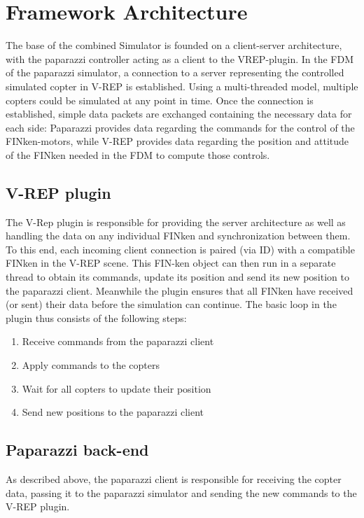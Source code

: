 \documentclass[journal]{IEEEtran}
\begin{document}
\section{Framework Architecture}

The base of the combined Simulator is founded on a client-server architecture, with the paparazzi controller acting as a client to the VREP-plugin. In the FDM of the paparazzi simulator, a connection to a server representing the controlled simulated copter in V-REP is established. Using a multi-threaded model, multiple copters could be simulated at any point in time. Once the connection is established, simple data packets are exchanged containing the necessary data for each side:
Paparazzi provides data regarding the commands for the control of the FINken-motors, while V-REP provides data regarding the position and attitude of the FINken needed in the FDM to compute those controls.

\subsection{V-REP plugin}

The V-Rep plugin is responsible for providing the server architecture as well as handling the data on any individual FINken and synchronization between them.
To this end, each incoming client connection is paired (via ID) with a compatible FINken in the V-REP scene. This FIN-ken object can then run in a separate thread to obtain its commands, update its position and send its new position to the paparazzi client. Meanwhile the plugin ensures that all FINken have received (or sent) their data before the simulation can continue.
The basic loop in the plugin thus consists of the following steps:

\begin{enumerate}[\textbf{ }1:]
	\item Receive commands from the paparazzi client
	\item Apply commands to the copters
	\item Wait for all copters to update their position
	\item Send new positions to the paparazzi client
\end{enumerate}


\subsection{Paparazzi back-end}

As described above, the paparazzi client is responsible for receiving the copter data, passing it to the paparazzi simulator and sending the new commands to the V-REP plugin. 
\end{document}

